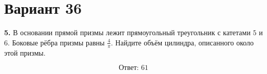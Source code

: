 \documentclass[12pt,a4paper]{article}
\begin{document}
\section*{Вариант 36}

\textbf{5.} В основании прямой призмы лежит прямоугольный треугольник
с катетами \(5\) и \(6\). Боковые рёбра призмы равны
\(\frac{4}{\pi}\).
Найдите объём цилиндра, описанного около этой призмы.

\begin{center}
\end{center}

\[
\boxed{\text{Ответ: }61}
\]
\end{document}
